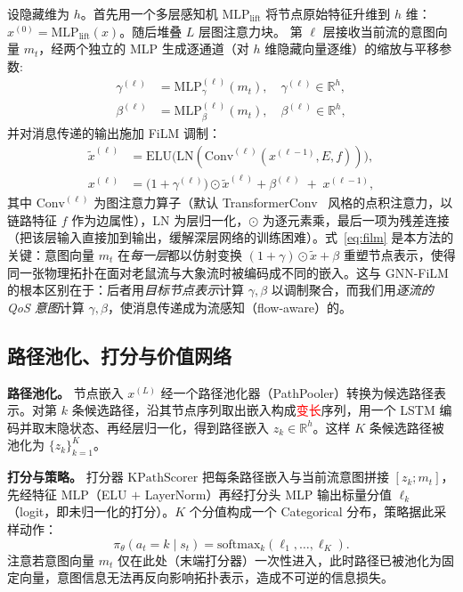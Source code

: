 设隐藏维为 $h$。首先用一个多层感知机 $\mathrm{MLP}_{\text{lift}}$ 将节点原始特征升维到 $h$ 维：$x^{(0)}=\mathrm{MLP}_{\text{lift}}(x)$。随后堆叠 $L$ 层图注意力块。
第 $\ell$ 层接收当前流的意图向量 $m_t$，经两个独立的 MLP 生成逐通道（对 $h$ 维隐藏向量逐维）的缩放与平移参数:
\begin{align}
\gamma^{(\ell)} &= \mathrm{MLP}^{(\ell)}_{\gamma}(m_t), \quad \gamma^{(\ell)}\in\mathbb{R}^{h},
\label{eq:film_gamma}\\
\beta^{(\ell)} &= \mathrm{MLP}^{(\ell)}_{\beta}(m_t), \quad \beta^{(\ell)}\in\mathbb{R}^{h},
\label{eq:film_beta}
\end{align}
并对消息传递的输出施加 FiLM 调制：
\begin{align}
\tilde x^{(\ell)} &= \mathrm{ELU}\!\big(\mathrm{LN}(\mathrm{Conv}^{(\ell)}(x^{(\ell-1)}, E, f))\big),
\label{eq:conv}\\
x^{(\ell)} &= \big(1+\gamma^{(\ell)}\big)\odot \tilde x^{(\ell)} + \beta^{(\ell)} \;+\; x^{(\ell-1)},
\label{eq:film}
\end{align}
其中 $\mathrm{Conv}^{(\ell)}$ 为图注意力算子（默认 TransformerConv~\cite{Shi2021_UniMP} 风格的点积注意力，以链路特征 $f$ 作为边属性），$\mathrm{LN}$ 为层归一化，$\odot$ 为逐元素乘，最后一项为残差连接（把该层输入直接加到输出，缓解深层网络的训练困难）。式~\eqref{eq:film} 是本方法的关键：意图向量 $m_t$ 在\emph{每一层}都以仿射变换 $(1+\gamma)\odot\tilde x+\beta$ 重塑节点表示，使得同一张物理拓扑在面对老鼠流与大象流时被编码成不同的嵌入。这与 GNN-FiLM~\cite{Brockschmidt2020_GNNFiLM} 的根本区别在于：后者用\emph{目标节点表示}计算 $\gamma,\beta$ 以调制聚合，而我们用\emph{逐流的 QoS 意图}计算 $\gamma,\beta$，使消息传递成为流感知（flow-aware）的。

\subsection{路径池化、打分与价值网络}
\label{sec:method:scorer}

\textbf{路径池化。} 节点嵌入 $x^{(L)}$ 经一个路径池化器（PathPooler）转换为候选路径表示。对第 $k$ 条候选路径，沿其节点序列取出嵌入构成\textcolor{red}{变长}序列，用一个 LSTM 编码并取末隐状态、再经层归一化，得到路径嵌入 $z_k\in\mathbb{R}^{h}$。这样 $K$ 条候选路径被池化为 $\{z_k\}_{k=1}^{K}$。

\textbf{打分与策略。} 打分器 $\mathrm{KPathScorer}$ 把每条路径嵌入与当前流意图拼接 $[z_k; m_t]$，先经特征 MLP（ELU $+$ LayerNorm）再经打分头 MLP 输出标量分值 $\ell_k$（logit，即未归一化的打分）。$K$ 个分值构成一个 Categorical 分布，策略据此采样动作：
\begin{equation}
\pi_\theta(a_t\!=\!k\mid s_t) = \mathrm{softmax}_k(\ell_1,\dots,\ell_K).
\label{eq:policy}
\end{equation}
注意若意图向量 $m_t$ 仅在此处（末端打分器）一次性进入，此时路径已被池化为固定向量，意图信息无法再反向影响拓扑表示，造成不可逆的信息损失。

